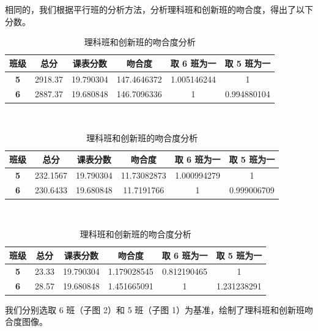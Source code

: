 \documentclass[a4paper]{article}
\begin{document}
  相同的，我们根据平行班的分析方法，分析理科班和创新班的吻合度，得出了以下分数。

  \begin{table}[H]
  \centering
  \begin{tabular}{cccccc}
  \toprule
  \bf 班级 & \bf 总分 & \bf 课表分数 & \bf 吻合度 & \bf 取 6 班为一 & \bf 取 5 班为一 \\
  \midrule
  \bf 5 & 2918.37 & 19.790304 & 147.4646372 & 1.005146244 & 1 \\
  \bf 6 & 2887.37 & 19.680848 & 146.7096336 & 1 & 0.994880104 \\
  \bottomrule
  \end{tabular}\\[2mm]

  \begin{tabular}{cccccc}
  \toprule
  \bf 班级 & \bf 总分 & \bf 课表分数 & \bf 吻合度 & \bf 取 6 班为一 & \bf 取 5 班为一 \\
  \midrule
  \bf 5 & 232.1567 & 19.790304 & 11.73082873 & 1.000994279 & 1 \\
  \bf 6 & 230.6433 & 19.680848 & 11.7191766 & 1 & 0.999006709 \\
  \bottomrule
  \end{tabular}\\[2mm]

  \begin{tabular}{cccccc}
  \toprule
  \bf 班级 & \bf 总分 & \bf 课表分数 & \bf 吻合度 & \bf 取 6 班为一 & \bf 取 5 班为一 \\
  \midrule
  \bf 5 & 23.33 & 19.790304 & 1.179028545 & 0.812190465 & 1 \\
  \bf 6 & 28.57 & 19.680848 & 1.451665091 & 1 & 1.231238291 \\
  \bottomrule
  \end{tabular}
  \caption{理科班和创新班的吻合度分析}
  \end{table}

  我们分别选取 6 班（子图 2）和 5 班（子图 1）为基准，绘制了理科班和创新班吻合度图像。
\end{document}
